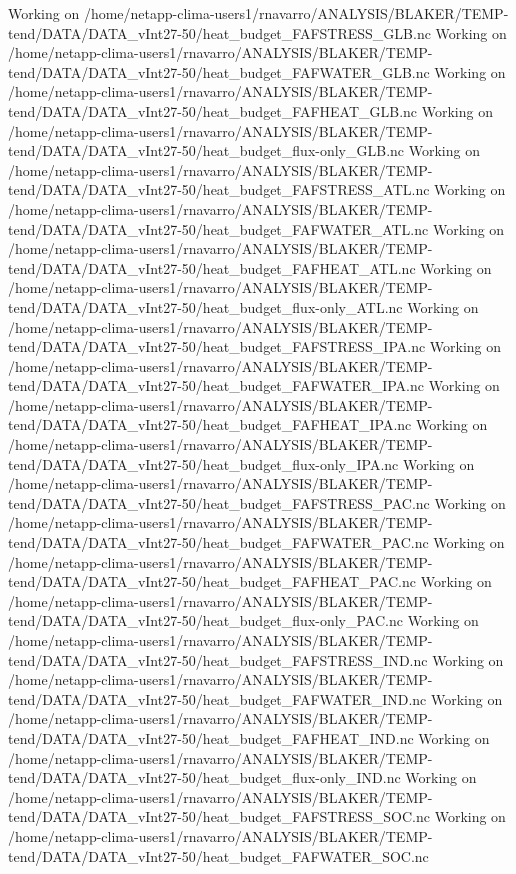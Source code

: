 Working on /home/netapp-clima-users1/rnavarro/ANALYSIS/BLAKER/TEMP-tend/DATA/DATA_vInt27-50/heat_budget_FAFSTRESS_GLB.nc
Working on /home/netapp-clima-users1/rnavarro/ANALYSIS/BLAKER/TEMP-tend/DATA/DATA_vInt27-50/heat_budget_FAFWATER_GLB.nc
Working on /home/netapp-clima-users1/rnavarro/ANALYSIS/BLAKER/TEMP-tend/DATA/DATA_vInt27-50/heat_budget_FAFHEAT_GLB.nc
Working on /home/netapp-clima-users1/rnavarro/ANALYSIS/BLAKER/TEMP-tend/DATA/DATA_vInt27-50/heat_budget_flux-only_GLB.nc
Working on /home/netapp-clima-users1/rnavarro/ANALYSIS/BLAKER/TEMP-tend/DATA/DATA_vInt27-50/heat_budget_FAFSTRESS_ATL.nc
Working on /home/netapp-clima-users1/rnavarro/ANALYSIS/BLAKER/TEMP-tend/DATA/DATA_vInt27-50/heat_budget_FAFWATER_ATL.nc
Working on /home/netapp-clima-users1/rnavarro/ANALYSIS/BLAKER/TEMP-tend/DATA/DATA_vInt27-50/heat_budget_FAFHEAT_ATL.nc
Working on /home/netapp-clima-users1/rnavarro/ANALYSIS/BLAKER/TEMP-tend/DATA/DATA_vInt27-50/heat_budget_flux-only_ATL.nc
Working on /home/netapp-clima-users1/rnavarro/ANALYSIS/BLAKER/TEMP-tend/DATA/DATA_vInt27-50/heat_budget_FAFSTRESS_IPA.nc
Working on /home/netapp-clima-users1/rnavarro/ANALYSIS/BLAKER/TEMP-tend/DATA/DATA_vInt27-50/heat_budget_FAFWATER_IPA.nc
Working on /home/netapp-clima-users1/rnavarro/ANALYSIS/BLAKER/TEMP-tend/DATA/DATA_vInt27-50/heat_budget_FAFHEAT_IPA.nc
Working on /home/netapp-clima-users1/rnavarro/ANALYSIS/BLAKER/TEMP-tend/DATA/DATA_vInt27-50/heat_budget_flux-only_IPA.nc
Working on /home/netapp-clima-users1/rnavarro/ANALYSIS/BLAKER/TEMP-tend/DATA/DATA_vInt27-50/heat_budget_FAFSTRESS_PAC.nc
Working on /home/netapp-clima-users1/rnavarro/ANALYSIS/BLAKER/TEMP-tend/DATA/DATA_vInt27-50/heat_budget_FAFWATER_PAC.nc
Working on /home/netapp-clima-users1/rnavarro/ANALYSIS/BLAKER/TEMP-tend/DATA/DATA_vInt27-50/heat_budget_FAFHEAT_PAC.nc
Working on /home/netapp-clima-users1/rnavarro/ANALYSIS/BLAKER/TEMP-tend/DATA/DATA_vInt27-50/heat_budget_flux-only_PAC.nc
Working on /home/netapp-clima-users1/rnavarro/ANALYSIS/BLAKER/TEMP-tend/DATA/DATA_vInt27-50/heat_budget_FAFSTRESS_IND.nc
Working on /home/netapp-clima-users1/rnavarro/ANALYSIS/BLAKER/TEMP-tend/DATA/DATA_vInt27-50/heat_budget_FAFWATER_IND.nc
Working on /home/netapp-clima-users1/rnavarro/ANALYSIS/BLAKER/TEMP-tend/DATA/DATA_vInt27-50/heat_budget_FAFHEAT_IND.nc
Working on /home/netapp-clima-users1/rnavarro/ANALYSIS/BLAKER/TEMP-tend/DATA/DATA_vInt27-50/heat_budget_flux-only_IND.nc
Working on /home/netapp-clima-users1/rnavarro/ANALYSIS/BLAKER/TEMP-tend/DATA/DATA_vInt27-50/heat_budget_FAFSTRESS_SOC.nc
Working on /home/netapp-clima-users1/rnavarro/ANALYSIS/BLAKER/TEMP-tend/DATA/DATA_vInt27-50/heat_budget_FAFWATER_SOC.nc
